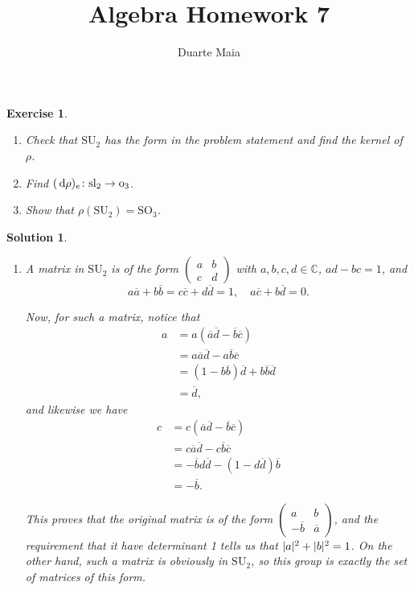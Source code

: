 \documentclass{article}
\title{Algebra Homework 7}
\author{Duarte Maia}
\newtheorem{ex}{Exercise}
\theoremstyle{nonumberplain}
\newtheorem{sol}{Solution}
\newcommand{\C}{\mathbb{C}}
\newcommand{\conj}[1]{\overline{#1}}
\renewcommand{\lg}[1]{\mathrm{#1}}
\newcommand{\la}[1]{\mathrm{#1}}
\DeclarePairedDelimiter{\abs}{\lvert}{\rvert}
\begin{document}
\maketitle

\begin{ex}
\leavevmode
\begin{enumerate}
\item Check that $\lg{SU}_2$ has the form in the problem statement and find the kernel of $\rho$.
\item Find $(\dl \rho)_e \colon \la{sl}_2 \to \la{o}_3$.
\item Show that $\rho(\lg{SU}_2) = \lg{SO}_3$.
\end{enumerate}
\end{ex}

\begin{sol}
\leavevmode
\begin{enumerate}
\item A matrix in $\lg{SU}_2$ is of the form $\left(\begin{smallmatrix} a & b \\ c & d\end{smallmatrix}\right)$ with $a,b,c,d \in \C$, $ad-bc = 1$, and
\begin{equation}
a \conj a + b \conj b = c \conj c + d \conj d = 1, \quad a \conj c + b \conj d = 0.
\end{equation}

Now, for such a matrix, notice that
\begin{equation}
\begin{aligned}
a &= a(\conj a \conj d - \conj b \conj c)\\
&= a \conj a \conj d - a \conj b \conj c \\
&= (1 - b \conj b) \conj d + b \conj b \conj d\\
&= \conj d,
\end{aligned}
\end{equation}
and likewise we have
\begin{equation}
\begin{aligned}
c &= c (\conj a \conj d - \conj b \conj c)\\
&= c \conj a \conj d - c \conj b \conj c\\
&= - \conj b d \conj d - (1 - d \conj d) \conj b\\
&= - \conj b.
\end{aligned}
\end{equation}

This proves that the original matrix is of the form $\left(\begin{smallmatrix} a & b \\ - \conj b & \conj a\end{smallmatrix}\right)$, and the requirement that it have determinant 1 tells us that $\abs{a}^2 + \abs{b}^2 = 1$. On the other hand, such a matrix is obviously in $\lg{SU}_2$, so this group is exactly the set of matrices of this form.


\end{enumerate}
\end{sol}
\end{document}
